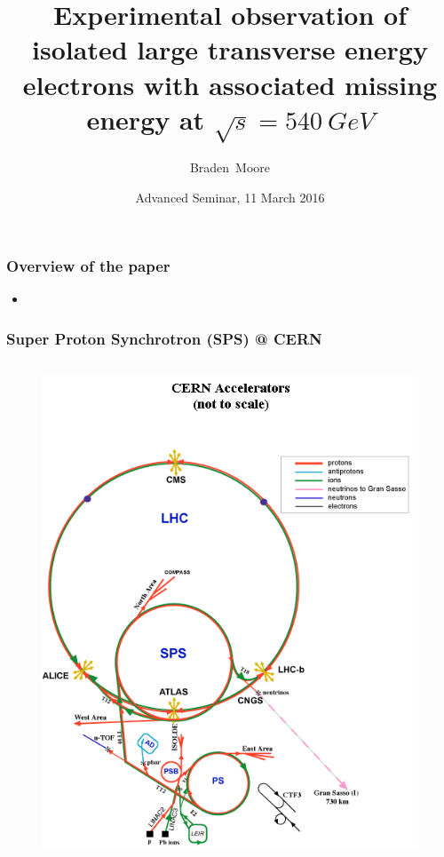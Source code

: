 \documentclass[xcolor=table]{beamer}
\title[Discovery of the W] %
{Experimental observation of isolated large transverse energy electrons with associated missing energy at $\sqrt{s}=\SI{540}{GeV}$}
\subtitle{}
\author[Braden Moore] %
{Braden~Moore}
\institute[] %
{
  School of Physics\\
  The University of Melbourne\\
  \vspace{0.5cm}
}
\date[11 March 2016] %
{Advanced Seminar, 11 March 2016}
\begin{document}
 
\frame{\titlepage}


\begin{frame}
\frametitle{Overview of the paper}

\begin{itemize}
\item 
\end{itemize}


\end{frame}


\begin{frame}
\frametitle{Super Proton Synchrotron (SPS) @ CERN}
\fontsize{7pt}{12}\selectfont

\begin{columns}


\begin{figure}[h]
\centering
\includegraphics[height=0.8\textheight]{images/sps.png}
\end{figure} 


\end{columns}
\end{frame}
\end{document}
